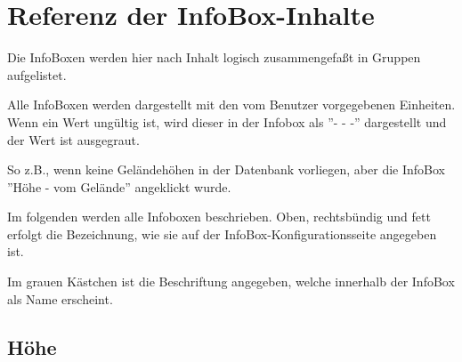 \chapter{Referenz der InfoBox-Inhalte}\label{cha:infobox}
Die InfoBoxen werden hier nach Inhalt logisch zusammengefaßt  in Gruppen aufgelistet.

Alle InfoBoxen werden dargestellt mit den vom Benutzer vorgegebenen  Einheiten.
Wenn ein Wert ungültig ist, wird dieser in der Infobox als ''- - -'' dargestellt und der Wert ist ausgegraut.

So z.B., wenn keine Geländehöhen in der Datenbank vorliegen, aber die InfoBox  ''Höhe - vom Gelände'' angeklickt wurde.


Im folgenden werden alle Infoboxen beschrieben. Oben, rechtsbündig und fett erfolgt die Bezeichnung,
wie sie auf der InfoBox-Konfigurationsseite angegeben ist.

Im grauen Kästchen ist die Beschriftung angegeben, welche innerhalb der InfoBox als Name erscheint.
%
\newcommand{\ibi}[3]{%
\jindent{%
\begin{tabular}{r}%
{\bf #1} \\%
\ibox{{#2}} \\%
\end{tabular}}{#3}%
}%
%
%
\section{Höhe}

